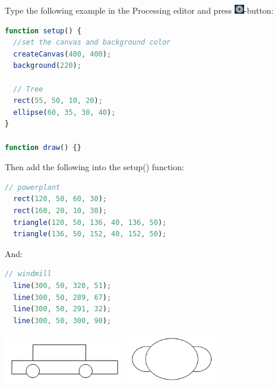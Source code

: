\newpage
{}
\begin{exercisebox}[adjusted title=First Program]
Type the following example in the Processing editor and press
\includegraphics[height=4mm]{illustrationer/processing_play_button}-button:

\begin{lstlisting}[language=JavaScript]
function setup() {
  //set the canvas and background color
  createCanvas(400, 400);
  background(220);
  
  // Tree
  rect(55, 50, 10, 20);
  ellipse(60, 35, 30, 40);
}

function draw() {}


\end{lstlisting}


Then add the following into the setup() function:
\begin{lstlisting}[language=JavaScript]
  // powerplant
  rect(120, 50, 60, 30);
  rect(160, 20, 10, 30);
  triangle(120, 50, 136, 40, 136, 50);
  triangle(136, 50, 152, 40, 152, 50);

\end{lstlisting}
And:
\begin{lstlisting}[language=JavaScript]
  // windmill
  line(300, 50, 320, 51);
  line(300, 50, 289, 67);
  line(300, 50, 291, 32);
  line(300, 50, 300, 90);
\end{lstlisting}

\includegraphics[width=0.4\textwidth]{illustrationer/bil-streg.png}
\includegraphics[width=0.3\textwidth]{illustrationer/sky.png}
\end{exercisebox}

